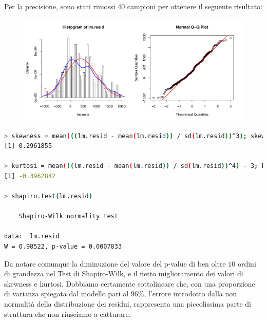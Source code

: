 \documentclass[11pt,a4paper]{article}
\begin{document}
\vspace{-2cm}\noindent
Per la precisione, sono stati rimossi $40$ campioni per ottenere il seguente
risultato:
\begin{figure}[H]
	\begin{center}
		\hspace*{-1.5cm}
		\includegraphics[scale=0.7]{imgs/residuals_2.pdf}
	\end{center}
\end{figure}
\vspace{-1.1cm}
\begin{lstlisting}[language=bash,basicstyle=\tiny,tabsize=2,frame = single]
> skewness = mean(((lm.resid - mean(lm.resid)) / sd(lm.resid))^3); skewness
[1] 0.2961855

> kurtosi = mean(((lm.resid - mean(lm.resid)) / sd(lm.resid))^4) - 3; kurtosi
[1] -0.3962842

> shapiro.test(lm.resid)

	Shapiro-Wilk normality test

data:  lm.resid
W = 0.98522, p-value = 0.0007833
\end{lstlisting}
Da notare comunque la diminuzione del valore del p-value di ben oltre $10$
ordini di grandezza nel Test di Shapiro-Wilk, e il netto miglioramento dei
valori di skewness e kurtosi. Dobbiamo certamente sottolineare che, con una
proporzione di varianza spiegata dal modello pari al $96\%$, l'errore introdotto
dalla non normalit\`a della distribuzione dei residui, rappresenta una
piccolissima parte di struttura che non riusciamo a catturare.
\end{document}
